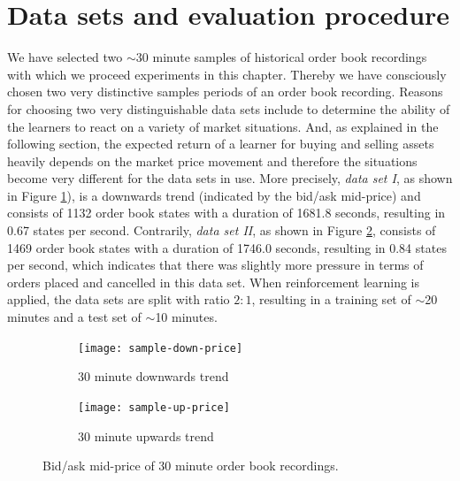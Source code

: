 \section{Data sets and evaluation procedure}
\label{sec:analysis-data-sets}
We have selected two $\sim$30 minute samples of historical order book recordings with which we proceed experiments in this chapter.
Thereby we have consciously chosen two very distinctive samples periods of an order book recording.
Reasons for choosing two very distinguishable data sets include to determine the ability of the learners to react on a variety of market situations.
And, as explained in the following section, the expected return of a learner for buying and selling assets heavily depends on the market price movement and therefore the situations become very different for the data sets in use.
More precisely, \textit{data set I}, as shown in Figure \ref{fig:sample-down-price}), is a downwards trend (indicated by the bid/ask mid-price) and consists of 1132 order book states with a duration of 1681.8 seconds, resulting in 0.67 states per second.
Contrarily, \textit{data set II}, as shown in Figure \ref{fig:sample-up-price}, consists of 1469 order book states with a duration of 1746.0 seconds, resulting in 0.84 states per second, which indicates that there was slightly more pressure in terms of orders placed and cancelled in this data set.
When reinforcement learning is applied, the data sets are split with ratio $2:1$, resulting in a training set of $\sim$20 minutes and a test set of $\sim$10 minutes.
\begin{figure}[H]
    \centering
    \begin{subfigure}[b]{0.45\textwidth}
        \texttt{[image: sample-down-price]}
        \caption{30 minute downwards trend}
        \label{fig:sample-down-price}
    \end{subfigure}
    \begin{subfigure}[b]{0.45\textwidth}
        \texttt{[image: sample-up-price]}
        \caption{30 minute upwards trend}
        \label{fig:sample-up-price}
    \end{subfigure}
    \caption{Bid/ask mid-price of 30 minute order book recordings.}
    \label{fig:sample-price}
\end{figure}

